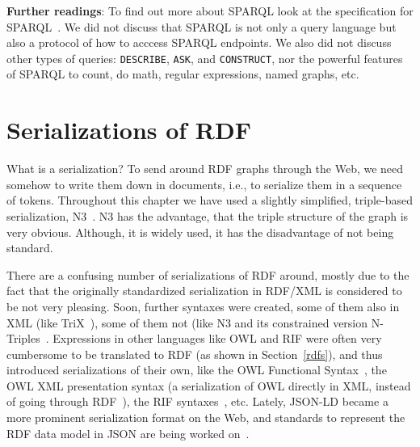 \medskip

\textbf{Further readings}:
To find out more about SPARQL look at the specification for SPARQL~\cite{Sparql11query}.
We did not discuss that SPARQL is not only a query language but also a protocol of how to acccess SPARQL endpoints.
We also did not discuss other types of queries: \texttt{DESCRIBE}, \texttt{ASK}, and \texttt{CONSTRUCT}, nor the powerful features of SPARQL to count, do math, regular expressions, named graphs, etc.

\section{Serializations of RDF}
\label{rdfa}
What is a serialization?
To send around RDF graphs through the Web, we need somehow to write them down in documents, i.e., to serialize them in a sequence of tokens.
Throughout this chapter we have used a slightly simplified, triple-based serialization, N3~\cite{n3-tech}.
N3 has the advantage, that the triple structure of the graph is very obvious.
Although, it is widely used, it has the disadvantage of not being standard.

There are a confusing number of serializations of RDF around, mostly due to the fact that the originally standardized serialization in RDF/XML is considered to be not very pleasing.
Soon, further syntaxes were created, some of them also in XML (like TriX~\cite{trix}), some of them not (like N3 and its constrained version N-Triples~\cite{ntriples}.
Expressions in other languages like OWL and RIF were often very cumbersome to be translated to RDF (as shown in Section~\ref{rdfs}), and thus introduced serializations of their own, like the OWL Functional Syntax~\cite{owl2}, the OWL XML presentation syntax (a serialization of OWL directly in XML, instead of going through RDF~\cite{owl3}), the RIF syntaxes~\cite{rif}, etc.
Lately, JSON-LD became a more prominent serialization format on the Web, and standards to represent the RDF data model in JSON are being worked on~\cite{json-ld}.


